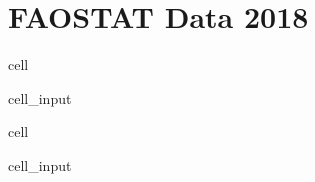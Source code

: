 \documentclass[letterpaper,10pt,english]{jupyterBook}
\begin{document}
\section{FAOSTAT Data 2018}
\label{\detokenize{notebooks/replicating_paper:faostat-data-2018}}
\begin{sphinxuseclass}{cell}\begin{sphinxVerbatimInput}

\begin{sphinxuseclass}{cell_input}
\begin{sphinxVerbatim}[commandchars=\\\{\}]
  

  
\end{sphinxVerbatim}

\end{sphinxuseclass}\end{sphinxVerbatimInput}

\end{sphinxuseclass}
\begin{sphinxuseclass}{cell}\begin{sphinxVerbatimInput}

\begin{sphinxuseclass}{cell_input}
\begin{sphinxVerbatim}[commandchars=\\\{\}]
  \PYG{p}{[}\PYG{p}{[}   \PYG{p}{]}\PYG{p}{]}
\end{sphinxVerbatim}

\end{sphinxuseclass}\end{sphinxVerbatimInput}

\end{sphinxuseclass}
\end{document}
